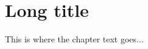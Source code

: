 \documentclass[../main.tex]{subfiles}
\begin{document}
\chapter[Short title]{Long title}
\label{cha:label}

This is where the chapter text goes...

\biblio
\end{document}
